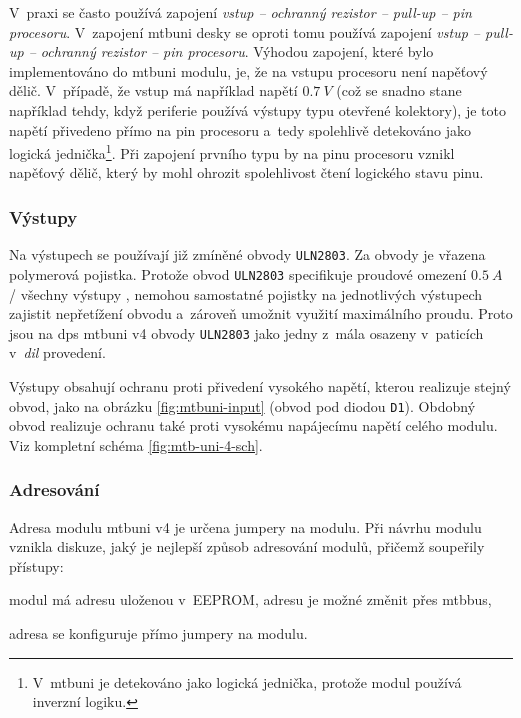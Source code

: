 V~praxi se často používá zapojení \textit{vstup – ochranný rezistor – pull-up –
pin procesoru}. V~zapojení \gls{mtbuni} desky se oproti tomu používá zapojení
\textit{vstup – pull-up – ochranný rezistor – pin procesoru}. Výhodou zapojení,
které bylo implementováno do \gls{mtbuni} modulu, je, že na vstupu procesoru
není napěťový dělič. V~případě, že vstup má například napětí $0.7~V$ (což se
snadno stane například tehdy, když periferie používá výstupy typu otevřené
kolektory), je toto napětí přivedeno přímo na pin procesoru a~tedy spolehlivě
detekováno jako logická jednička\footnote{V~\gls{mtbuni} je detekováno
jako logická jednička, protože modul používá inverzní logiku.}. Při zapojení
prvního typu by na pinu procesoru vznikl napěťový dělič, který by mohl ohrozit
spolehlivost čtení logického stavu pinu.

\subsubsection{\textbf{Výstupy}}

Na výstupech se používají již zmíněné obvody \texttt{ULN2803}. Za obvody
je vřazena polymerová pojistka. Protože obvod \texttt{ULN2803} specifikuje
proudové omezení $0.5~A$ / všechny výstupy \cite{uln2803-datasheet}, nemohou
samostatné pojistky na jednotlivých výstupech zajistit nepřetížení obvodu
a~zároveň umožnit využití maximálního proudu. Proto jsou na \gls{dps}
\gls{mtbuni} v4 obvody \texttt{ULN2803} jako jedny z~mála osazeny v~paticích
v~\textit{\gls{dil}} provedení.

Výstupy obsahují ochranu proti přivedení vysokého napětí, kterou realizuje
stejný obvod, jako na obrázku \ref{fig:mtbuni-input} (obvod pod diodou
\texttt{D1}). Obdobný obvod realizuje ochranu také proti vysokému napájecímu
napětí celého modulu. Viz kompletní schéma \ref{fig:mtb-uni-4-sch}.

\subsubsection{\textbf{Adresování}}

Adresa modulu \gls{mtbuni} v4 je určena jumpery na modulu. Při návrhu modulu
vznikla diskuze, jaký je nejlepší způsob adresování modulů, přičemž soupeřily
přístupy:

\begin{compactenum}
\item modul má adresu uloženou v~EEPROM, adresu je možné změnit přes \gls{mtbbus},
\item adresa se konfiguruje přímo jumpery na modulu.
\end{compactenum}

